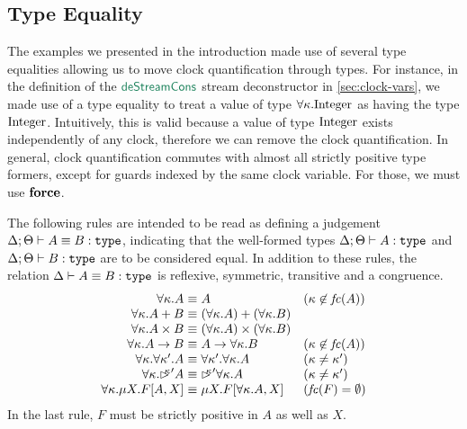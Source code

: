 \subsection{Type Equality}
\label{sec:type-equality}

The examples we presented in the introduction made use of several type
equalities allowing us to move clock quantification through types. For
instance, in the definition of the $\elim{deStreamCons}$ stream
deconstructor in \autoref{sec:clock-vars}, we made use of a type
equality to treat a value of type $\forall \kappa. \textrm{Integer}$
as having the type $\textrm{Integer}$. Intuitively, this is valid
because a value of type $\textrm{Integer}$ exists independently of any
clock, therefore we can remove the clock quantification. In general,
clock quantification commutes with almost all strictly positive type
formers, except for guards indexed by the same clock variable. For
those, we must use $\textbf{force}$.

The following rules are intended to be read as defining a judgement
$\Delta; \Theta \vdash A \equiv B : \texttt{\textup{type}}$, indicating that the
well-formed types $\Delta; \Theta \vdash A : \texttt{\textup{type}}$ and $\Delta;
\Theta \vdash B : \texttt{\textup{type}}$ are to be considered equal. In addition
to these rules, the relation $\Delta \vdash A \equiv B : \texttt{\textup{type}}$ is
reflexive, symmetric, transitive and a congruence.
\begin{displaymath}
  \begin{array}{r@{\hspace{0.3em}}c@{\hspace{0.3em}}ll}
    \forall \kappa. A & \equiv & A & (\kappa \not\in \mathit{fc}(A)) \\
    \forall \kappa. A + B & \equiv & (\forall \kappa. A) + (\forall \kappa. B) \\
    \forall \kappa.  A \times B & \equiv & (\forall \kappa. A) \times (\forall \kappa. B) \\
    \forall \kappa. A \to B & \equiv & A \to \forall \kappa. B & (\kappa \not\in \mathit{fc}(A)) \\
    \forall \kappa. \forall \kappa'. A & \equiv & \forall \kappa'. \forall \kappa. A & (\kappa \not= \kappa') \\
    \forall \kappa. \delay\kappa' A & \equiv & \delay\kappa'\forall \kappa. A & (\kappa \not= \kappa') \\
    \forall \kappa. \mu X. F[A,X] & \equiv & \mu X. F[\forall \kappa. A,X] & (\mathit{fc}(F) = \emptyset)
  \end{array}
\end{displaymath}
In the last rule, $F$ must be strictly positive in $A$ as well as $X$.

